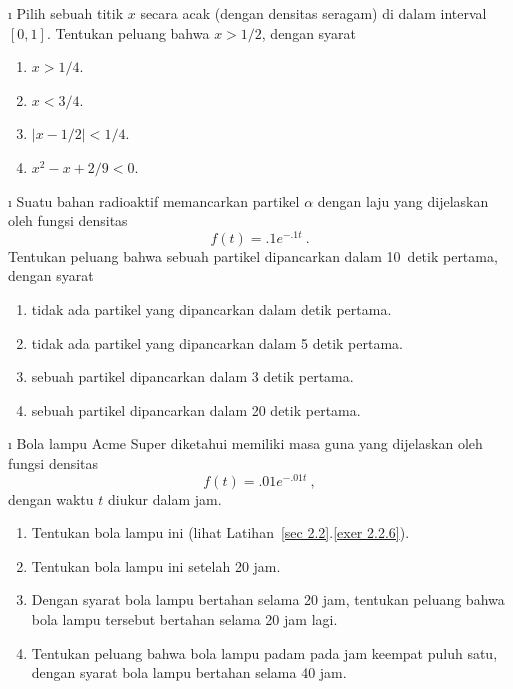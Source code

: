 \exercises
\begin{LJSItem}

\i\label{exer 4.2.1} Pilih sebuah titik $x$ secara acak (dengan densitas seragam) di dalam interval
$[0,1]$.  Tentukan peluang bahwa $x > 1/2$, dengan syarat
\begin{enumerate}
\item $x > 1/4$.

\item $x < 3/4$.

\item $|x - 1/2| < 1/4$.

\item $x^2 - x + 2/9 < 0$.
\end{enumerate}

\i\label{exer 4.2.2} Suatu bahan radioaktif memancarkan partikel $\alpha$ dengan laju yang dijelaskan oleh
fungsi densitas
$$
f(t) = .1e^{-.1t}\ .
$$
Tentukan peluang
bahwa sebuah partikel dipancarkan dalam 10~detik pertama, dengan syarat
\begin{enumerate}
\item tidak ada partikel yang dipancarkan dalam detik pertama.

\item tidak ada partikel yang dipancarkan dalam 5 detik pertama.

\item sebuah partikel dipancarkan dalam 3 detik pertama.

\item sebuah partikel dipancarkan dalam 20 detik pertama.
\end{enumerate}

\i\label{exer 4.2.3} Bola lampu Acme Super diketahui memiliki masa guna yang
dijelaskan oleh fungsi densitas
$$
f(t) = .01e^{-.01t}\ ,
$$
dengan waktu $t$ diukur dalam jam.  
\begin{enumerate}
\item Tentukan  bola lampu ini 
(lihat Latihan~\ref{sec 2.2}.\ref{exer 2.2.6}).

\item Tentukan  bola lampu ini setelah 20 jam.

\item Dengan syarat bola lampu bertahan selama 20 jam, tentukan peluang bahwa bola lampu
tersebut bertahan selama 20 jam lagi.

\item Tentukan peluang bahwa bola lampu padam pada jam keempat puluh satu, dengan syarat
bola lampu bertahan selama 40 jam.
\end{enumerate}


\end{LJSItem}
